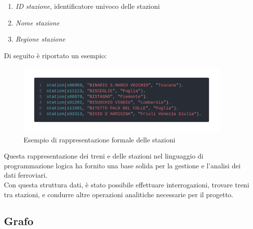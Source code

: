\documentclass[italian,12pt,a4paper]{article}
\begin{document}
		\begin{enumerate}
			\item \textit{ID stazione}, identificatore univoco delle stazioni
			\item \textit{Nome stazione}
			\item \textit{Regione stazione}
		\end{enumerate}
		Di seguito è riportato un esempio:
	
		\begin{figure}[!h]
			\centering
			\includegraphics[width=400px]{img/code_prolog2}
			\caption{Esempio di rappresentazione formale delle stazioni}
		\end{figure}
		\vspace{10px}
		\setlength{\parindent}{0cm}
		Questa rappresentazione dei treni e delle stazioni nel linguaggio di programmazione logica ha fornito una base solida per la gestione e l'analisi dei dati ferroviari. \\
		\linebreak
		Con questa struttura dati, è stato possibile effettuare interrogazioni, trovare treni tra stazioni, e condurre altre operazioni analitiche necessarie per il progetto.

\subsection{Grafo}
\end{document}
